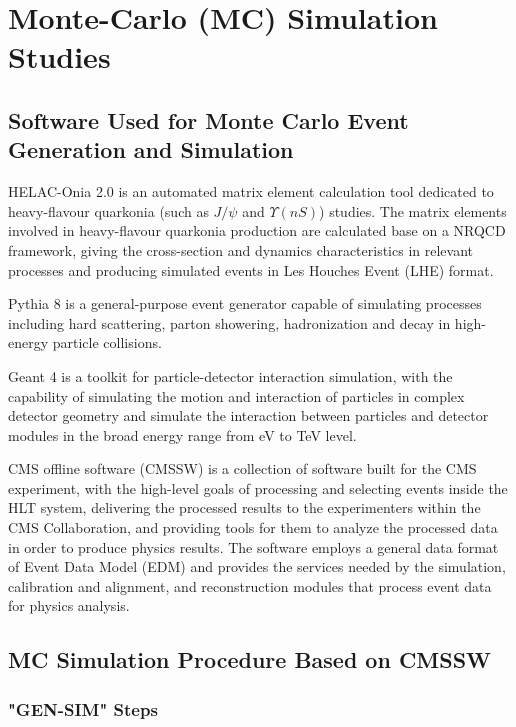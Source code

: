 \documentclass[10pt,twocolumn]{article}
\begin{document}
\section{Monte-Carlo (MC) Simulation Studies}

\subsection{Software Used for Monte Carlo Event Generation and Simulation}

HELAC-Onia 2.0 is an automated matrix element calculation tool dedicated to heavy-flavour quarkonia (such as $J/\psi$ and $\Upsilon(nS)$) studies. The matrix elements involved in heavy-flavour quarkonia production are calculated base on a NRQCD framework, giving the cross-section and dynamics characteristics in relevant processes and producing simulated events in Les Houches Event (LHE) format.\cite{HS_SHAO_HO}\cite{HS_SHAO_HO_2}

Pythia 8 is a general-purpose event generator capable of simulating processes including hard scattering, parton showering, hadronization and decay in high-energy particle collisions.\cite{PYTHIA_8_2}

Geant 4 is a toolkit for particle-detector interaction simulation, with the capability of simulating the motion and interaction of particles in complex detector geometry and simulate the interaction between particles and detector modules in the broad energy range from eV to TeV level.\cite{GEANT4}

CMS offline software (CMSSW) is a collection of software built for the CMS experiment, with the high-level goals of processing and selecting events inside the HLT system, delivering the processed results to the experimenters within the CMS Collaboration, and providing tools for them to analyze the processed data in order to produce physics results. The software employs a general data format of Event Data Model (EDM) and provides the services needed by the simulation, calibration and alignment, and reconstruction modules that process event data for physics analysis.

\subsection{MC Simulation Procedure Based on CMSSW}\label{sec:MC-FUllChain}

\subsubsection{"GEN-SIM" Steps}
\end{document}
